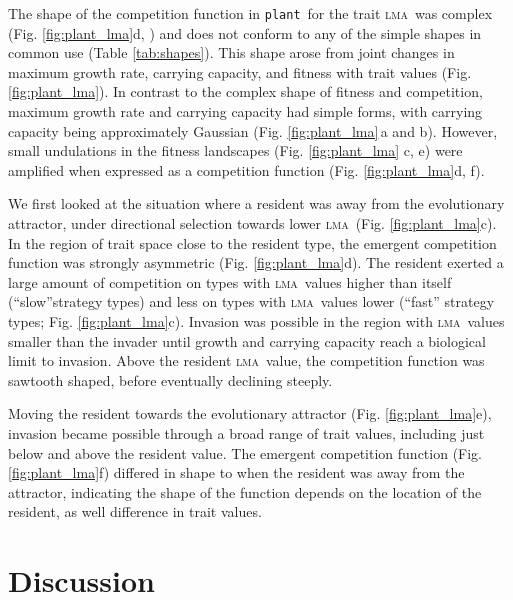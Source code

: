 \documentclass[a4paper,11pt]{article}
\newcommand{\plant}{{\tt plant}}
\newcommand{\lma}{\textsc{lma}}
\begin{document}
The shape of the competition function in \plant\ for the trait \lma\ was complex (Fig. \ref{fig:plant_lma}d, ) and does not conform to any of the simple shapes in common use (Table \ref{tab:shapes}). This shape arose from joint changes in maximum growth rate, carrying capacity, and fitness with trait values (Fig. \ref{fig:plant_lma}). In contrast to the complex shape of fitness and competition, maximum growth rate and carrying capacity had simple forms, with carrying capacity being approximately Gaussian (Fig. \ref{fig:plant_lma}\,a and b). However, small undulations in the fitness landscapes (Fig. \ref{fig:plant_lma} c, e) were amplified when expressed as a competition function (Fig. \ref{fig:plant_lma}d, f). 

We first looked at the situation where a resident was away from the evolutionary attractor, under directional selection towards lower \lma\ (Fig. \ref{fig:plant_lma}c). In the region of trait space close to the resident type, the emergent competition function was strongly asymmetric (Fig. \ref{fig:plant_lma}d). The resident exerted a large amount of competition on types with \lma\ values higher than itself (``slow''strategy types) and less on types with \lma\ values lower (``fast'' strategy types; Fig. \ref{fig:plant_lma}c). Invasion was possible in the region with \lma\ values smaller than the invader until growth and carrying capacity reach a biological limit to invasion. Above the resident \lma\ value, the competition function was sawtooth shaped, before eventually declining steeply.

Moving the resident towards the evolutionary attractor (Fig. \ref{fig:plant_lma}e), invasion became possible through a broad range of trait values, including just below and above the resident value. The emergent competition function (Fig. \ref{fig:plant_lma}f) differed in shape to when the resident was away from the attractor, indicating the shape of the function depends on the location of the resident, as well difference in trait values.

\section{Discussion}
\end{document}
